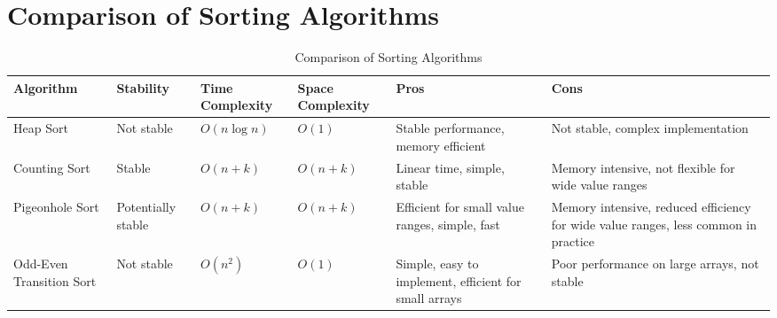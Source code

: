 \section{Comparison of Sorting Algorithms}

\begin{table}[H]
    \centering
    \renewcommand{\arraystretch}{1.2} %
    \setlength{\tabcolsep}{4pt} %
    \footnotesize 
    \begin{tabularx}{\textwidth}{|>{\centering\arraybackslash}X|>{\centering\arraybackslash}X|>{\centering\arraybackslash}X|>{\centering\arraybackslash}X|>{\centering\arraybackslash}X|>{\centering\arraybackslash}X|}
        \hline
        \textbf{Algorithm} & \textbf{Stability} & \textbf{Time Complexity} & \textbf{Space Complexity} & \textbf{Pros} & \textbf{Cons} \\ \hline
        Heap Sort          & Not stable         & $O(n \log n)$            & $O(1)$                    & Stable performance, memory efficient & Not stable, complex implementation \\ \hline
        Counting Sort      & Stable             & $O(n + k)$               & $O(n + k)$                & Linear time, simple, stable           & Memory intensive, not flexible for wide value ranges \\ \hline
        Pigeonhole Sort    & Potentially stable & $O(n + k)$               & $O(n + k)$                & Efficient for small value ranges, simple, fast & Memory intensive, reduced efficiency for wide value ranges, less common in practice \\ \hline
        Odd-Even Transition Sort & Not stable & $O(n^2)$ & $O(1)$ & Simple, easy to implement, efficient for small arrays & Poor performance on large arrays, not stable \\ \hline
    \end{tabularx}
    \caption{Comparison of Sorting Algorithms}
    \label{tab:sorting_algorithms}
\end{table}
